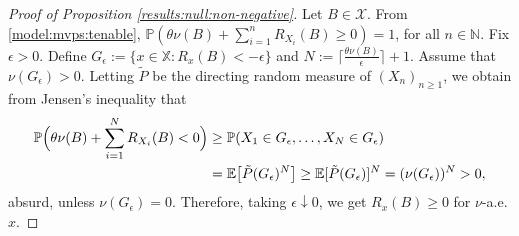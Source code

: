 \documentclass[a4paper]{article}
\theoremstyle{plain}
\theoremstyle{remark}
\theoremstyle{definition}
\begin{document}
\begin{proof}[Proof of Proposition \ref{results:null:non-negative}]
Let $B\in\mathcal{X}$. From \eqref{model:mvps:tenable}, $\mathbb{P}(\theta\nu(B)+\sum_{i=1}^nR_{X_i}(B)\geq0)=1$, for all $n\in\mathbb{N}$. Fix $\epsilon>0$. Define $G_\epsilon:=\{x\in\mathbb{X}:R_x(B)<-\epsilon\}$ and $N:=\bigl\lceil\frac{\theta\nu(B)}{\epsilon}\bigr\rceil+1$. Assume that $\nu(G_\epsilon)>0$. Letting $\tilde{P}$ be the directing random measure of $(X_n)_{n\geq1}$, we obtain from Jensen's inequality that
\begingroup\allowdisplaybreaks
\begin{align*}
\mathbb{P}\Bigl(\theta\nu(B)+\sum_{i=1}^NR_{X_i}(B)<0\Bigr)&\geq\mathbb{P}(X_1\in G_\epsilon,\ldots,X_N\in G_\epsilon)\\
&=\mathbb{E}\bigl[\tilde{P}(G_\epsilon)^N\bigr]\geq\mathbb{E}[\tilde{P}(G_\epsilon)]^N=(\nu(G_\epsilon))^N>0,
\end{align*}
\endgroup
absurd, unless $\nu(G_\epsilon)=0$. Therefore, taking $\epsilon\downarrow0$, we get $R_x(B)\geq0$ for $\nu$-a.e. $x$.
\end{proof}
\end{document}
